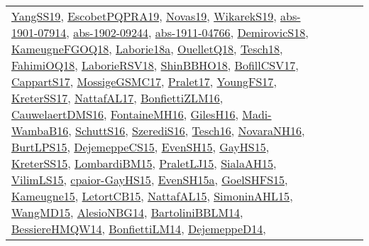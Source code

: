{\begin{longtable}{llp{6cm}p{6cm}p{6cm}}
\href{papers/YangSS19.pdf}{YangSS19}\cite{YangSS19}, \href{articles/EscobetPQPRA19.pdf}{EscobetPQPRA19}\cite{EscobetPQPRA19}, \href{articles/Novas19.pdf}{Novas19}\cite{Novas19}, \href{articles/WikarekS19.pdf}{WikarekS19}\cite{WikarekS19}, \href{articles/abs-1901-07914.pdf}{abs-1901-07914}\cite{abs-1901-07914}, \href{articles/abs-1902-09244.pdf}{abs-1902-09244}\cite{abs-1902-09244}, \href{articles/abs-1911-04766.pdf}{abs-1911-04766}\cite{abs-1911-04766}, \href{papers/DemirovicS18.pdf}{DemirovicS18}\cite{DemirovicS18}, \href{papers/KameugneFGOQ18.pdf}{KameugneFGOQ18}\cite{KameugneFGOQ18}, \href{papers/Laborie18a.pdf}{Laborie18a}\cite{Laborie18a}, \href{papers/OuelletQ18.pdf}{OuelletQ18}\cite{OuelletQ18}, \href{papers/Tesch18.pdf}{Tesch18}\cite{Tesch18}, \href{articles/FahimiOQ18.pdf}{FahimiOQ18}\cite{FahimiOQ18}, \href{articles/LaborieRSV18.pdf}{LaborieRSV18}\cite{LaborieRSV18}, \href{articles/ShinBBHO18.pdf}{ShinBBHO18}\cite{ShinBBHO18}, \href{papers/BofillCSV17.pdf}{BofillCSV17}\cite{BofillCSV17}, \href{papers/CappartS17.pdf}{CappartS17}\cite{CappartS17}, \href{papers/MossigeGSMC17.pdf}{MossigeGSMC17}\cite{MossigeGSMC17}, \href{papers/Pralet17.pdf}{Pralet17}\cite{Pralet17}, \href{papers/YoungFS17.pdf}{YoungFS17}\cite{YoungFS17}, \href{articles/KreterSS17.pdf}{KreterSS17}\cite{KreterSS17}, \href{articles/NattafAL17.pdf}{NattafAL17}\cite{NattafAL17}, \href{papers/BonfiettiZLM16.pdf}{BonfiettiZLM16}\cite{BonfiettiZLM16}, \href{papers/CauwelaertDMS16.pdf}{CauwelaertDMS16}\cite{CauwelaertDMS16}, \href{papers/FontaineMH16.pdf}{FontaineMH16}\cite{FontaineMH16}, \href{papers/GilesH16.pdf}{GilesH16}\cite{GilesH16}, \href{papers/Madi-WambaB16.pdf}{Madi-WambaB16}\cite{Madi-WambaB16}, \href{papers/SchuttS16.pdf}{SchuttS16}\cite{SchuttS16}, \href{papers/SzerediS16.pdf}{SzerediS16}\cite{SzerediS16}, \href{papers/Tesch16.pdf}{Tesch16}\cite{Tesch16}, \href{articles/NovaraNH16.pdf}{NovaraNH16}\cite{NovaraNH16}, \href{papers/BurtLPS15.pdf}{BurtLPS15}\cite{BurtLPS15}, \href{papers/DejemeppeCS15.pdf}{DejemeppeCS15}\cite{DejemeppeCS15}, \href{papers/EvenSH15.pdf}{EvenSH15}\cite{EvenSH15}, \href{papers/GayHS15.pdf}{GayHS15}\cite{GayHS15}, \href{papers/KreterSS15.pdf}{KreterSS15}\cite{KreterSS15}, \href{papers/LombardiBM15.pdf}{LombardiBM15}\cite{LombardiBM15}, \href{papers/PraletLJ15.pdf}{PraletLJ15}\cite{PraletLJ15}, \href{papers/SialaAH15.pdf}{SialaAH15}\cite{SialaAH15}, \href{papers/VilimLS15.pdf}{VilimLS15}\cite{VilimLS15}, \href{papers/cpaior-GayHS15.pdf}{cpaior-GayHS15}\cite{cpaior-GayHS15}, \href{articles/EvenSH15a.pdf}{EvenSH15a}\cite{EvenSH15a}, \href{articles/GoelSHFS15.pdf}{GoelSHFS15}\cite{GoelSHFS15}, \href{articles/Kameugne15.pdf}{Kameugne15}\cite{Kameugne15}, \href{articles/LetortCB15.pdf}{LetortCB15}\cite{LetortCB15}, \href{articles/NattafAL15.pdf}{NattafAL15}\cite{NattafAL15}, \href{articles/SimoninAHL15.pdf}{SimoninAHL15}\cite{SimoninAHL15}, \href{articles/WangMD15.pdf}{WangMD15}\cite{WangMD15}, \href{papers/AlesioNBG14.pdf}{AlesioNBG14}\cite{AlesioNBG14}, \href{papers/BartoliniBBLM14.pdf}{BartoliniBBLM14}\cite{BartoliniBBLM14}, \href{papers/BessiereHMQW14.pdf}{BessiereHMQW14}\cite{BessiereHMQW14}, \href{papers/BonfiettiLM14.pdf}{BonfiettiLM14}\cite{BonfiettiLM14}, \href{papers/DejemeppeD14.pdf}{DejemeppeD14}\cite{DejemeppeD14}, 
\end{longtable}}
